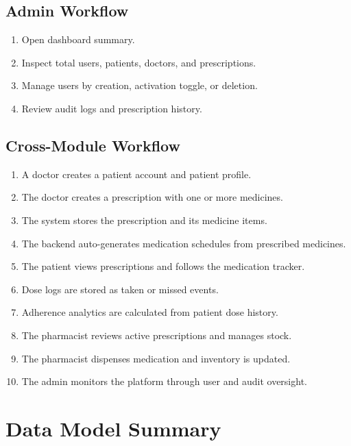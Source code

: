 \documentclass[12pt,a4paper]{article}
\begin{document}
\subsection{Admin Workflow}
\begin{enumerate}[leftmargin=*]
  \item Open dashboard summary.
  \item Inspect total users, patients, doctors, and prescriptions.
  \item Manage users by creation, activation toggle, or deletion.
  \item Review audit logs and prescription history.
\end{enumerate}

\subsection{Cross-Module Workflow}
\begin{enumerate}[leftmargin=*]
  \item A doctor creates a patient account and patient profile.
  \item The doctor creates a prescription with one or more medicines.
  \item The system stores the prescription and its medicine items.
  \item The backend auto-generates medication schedules from prescribed medicines.
  \item The patient views prescriptions and follows the medication tracker.
  \item Dose logs are stored as taken or missed events.
  \item Adherence analytics are calculated from patient dose history.
  \item The pharmacist reviews active prescriptions and manages stock.
  \item The pharmacist dispenses medication and inventory is updated.
  \item The admin monitors the platform through user and audit oversight.
\end{enumerate}

\section{Data Model Summary}
\end{document}
